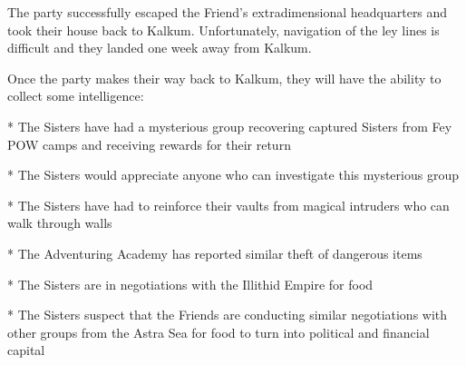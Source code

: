 The party successfully escaped the Friend's extradimensional headquarters and took their house back to Kalkum.
Unfortunately, navigation of the ley lines is difficult and they landed one week away from Kalkum.

Once the party makes their way back to Kalkum, they will have the ability to collect some intelligence:

* The Sisters have had a mysterious group recovering captured Sisters from Fey POW camps and receiving rewards for their return

* The Sisters would appreciate anyone who can investigate this mysterious group

* The Sisters have had to reinforce their vaults from magical intruders who can walk through walls

* The Adventuring Academy has reported similar theft of dangerous items

* The Sisters are in negotiations with the Illithid Empire for food

* The Sisters suspect that the Friends are conducting similar negotiations with other groups from the Astra Sea for food to turn into political and financial capital
